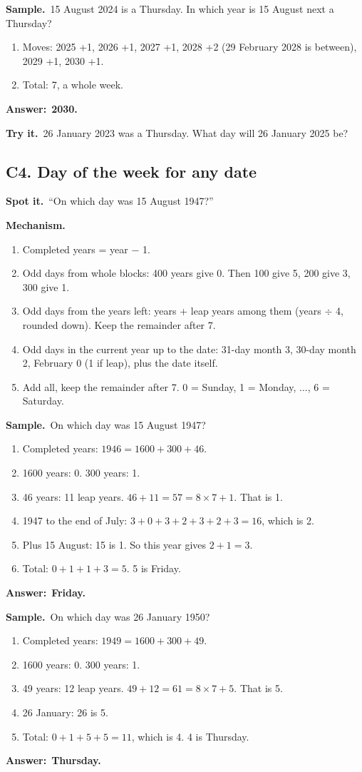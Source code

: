 \documentclass[11pt,a4paper]{article}
\let\oldsubsection\subsection
\renewcommand{\subsection}{\needspace{9\baselineskip}\oldsubsection}
\newcommand{\spot}{\textbf{\color{ember}Spot it.}\ }
\newcommand{\mech}{\textbf{\color{ember}Mechanism.}\ }
\newif\ifkeepsamp
\newcommand{\ans}[1]{\par\nopagebreak\noindent\textbf{\color{ember}Answer:}\ \textbf{#1}\par}
\newcommand{\samp}{\ifkeepsamp\needspace{4\baselineskip}\fi\textbf{\color{ember}Sample.}\ }
\newcommand{\tryit}[1]{\textbf{\color{ember}Try it.}\ #1}
\begin{document}
\samp 15 August 2024 is a Thursday. In which year is 15 August next a Thursday?
\begin{enumerate}
\item Moves: 2025 +1, 2026 +1, 2027 +1, 2028 +2 (29 February 2028 is between), 2029 +1, 2030 +1.
\item Total: 7, a whole week.
\end{enumerate}
\ans{2030.}

\tryit 26 January 2023 was a Thursday. What day will 26 January 2025 be?

\subsection{C4. Day of the week for any date}
\spot ``On which day was 15 August 1947?''

\mech
\begin{enumerate}
\item Completed years = year $-$ 1.
\item Odd days from whole blocks: 400 years give 0. Then 100 give 5, 200 give 3, 300 give 1.
\item Odd days from the years left: years + leap years among them (years $\div$ 4, rounded down). Keep the remainder after 7.
\item Odd days in the current year up to the date: 31-day month 3, 30-day month 2, February 0 (1 if leap), plus the date itself.
\item Add all, keep the remainder after 7. 0 = Sunday, 1 = Monday, ..., 6 = Saturday.
\end{enumerate}

\samp On which day was 15 August 1947?
\begin{enumerate}
\item Completed years: $1946 = 1600 + 300 + 46$.
\item 1600 years: 0. 300 years: 1.
\item 46 years: 11 leap years. $46 + 11 = 57 = 8 \times 7 + 1$. That is 1.
\item 1947 to the end of July: $3 + 0 + 3 + 2 + 3 + 2 + 3 = 16$, which is 2.
\item Plus 15 August: 15 is 1. So this year gives $2 + 1 = 3$.
\item Total: $0 + 1 + 1 + 3 = 5$. 5 is Friday.
\end{enumerate}
\ans{Friday.}

\samp On which day was 26 January 1950?
\begin{enumerate}
\item Completed years: $1949 = 1600 + 300 + 49$.
\item 1600 years: 0. 300 years: 1.
\item 49 years: 12 leap years. $49 + 12 = 61 = 8 \times 7 + 5$. That is 5.
\item 26 January: 26 is 5.
\item Total: $0 + 1 + 5 + 5 = 11$, which is 4. 4 is Thursday.
\end{enumerate}
\ans{Thursday.}
\end{document}
